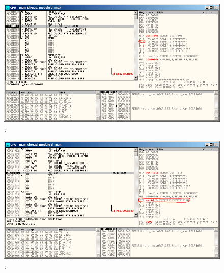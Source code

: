 \begin{figure}[H]
\centering
\includegraphics[scale=\FigScale]{patterns/12_FPU/3_comparison/x86/MSVC/olly1_4.png}
\caption{\olly: \TEST {}}
\label{fig:FPU_comparison_case1_olly4}
\end{figure}

\begin{figure}[H]
\centering
\includegraphics[scale=\FigScale]{patterns/12_FPU/3_comparison/x86/MSVC/olly1_5.png}
\caption{\olly: }
\label{fig:FPU_comparison_case1_olly5}
\end{figure}


